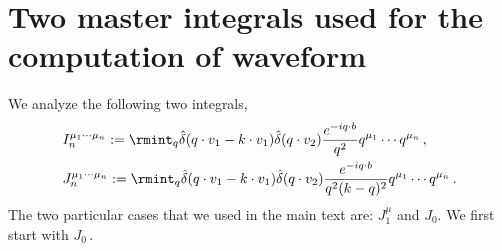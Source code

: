 \section{Two master integrals used for the computation of  waveform}\label{ch2:app:C}
We analyze the following two integrals,
\begin{align}
    \begin{split}
     &   I^{\mu_1\cdots\mu_n}_n:=\rmint_{q}\hat\delta(q\cdot v_1-k\cdot v_1)\hat\delta(q\cdot v_2)\frac{e^{-iq\cdot b}}{q^2}q^{\mu_1}\cdots q^{\mu_n}\,,\\ &
     J^{\mu_1\cdots\mu_n}_n:=\rmint_{q}\hat\delta(q\cdot v_1-k\cdot v_1)\hat\delta(q\cdot v_2)\frac{e^{-iq\cdot b}}{q^2(k-q)^2}q^{\mu_1}\cdots q^{\mu_n}\,.
    \end{split}
\end{align}
The two particular cases that we used in the main text are: $J^{\mu}_{1}$ and $J_{0}$. We first start with $J_{0}\,.$

